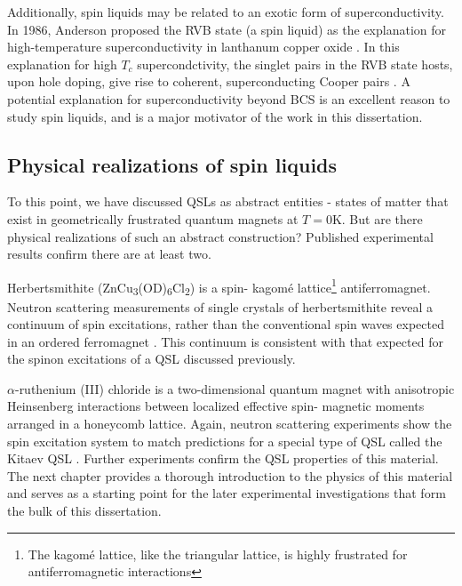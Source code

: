 Additionally, spin liquids may be related to an exotic form of superconductivity. In 1986, Anderson proposed the RVB state (a spin liquid) as the explanation for high-temperature superconductivity in lanthanum copper oxide \cite{Anderson1986}. In this explanation for high $T_{c}$ supercondctivity, the singlet pairs in the RVB state hosts, upon hole doping, give rise to coherent, superconducting Cooper pairs  \cite{Chen2018}. A potential explanation for superconductivity beyond BCS is an excellent reason to study spin liquids, and is a major motivator of the work in this dissertation.

\subsection{Physical realizations of spin liquids}

To this point, we have discussed QSLs as abstract entities - states of matter that exist in geometrically frustrated quantum magnets at $T = 0$K. But are there physical realizations of such an abstract construction? Published experimental results confirm there are at least two.

Herbertsmithite (ZnCu\textsubscript{3}(OD)\textsubscript{6}Cl\textsubscript{2}) is a spin-\textonehalf{} kagom\'{e}{} lattice\footnote{The kagom\'{e} lattice, like the triangular lattice, is highly frustrated for antiferromagnetic interactions} antiferromagnet. Neutron scattering measurements of single crystals of herbertsmithite reveal a continuum of spin excitations, rather than the conventional spin waves expected in an ordered ferromagnet \cite{Han2012}. This continuum is consistent with that expected for the spinon excitations of a QSL discussed previously.

$\alpha$-ruthenium (III) chloride is a two-dimensional quantum magnet with anisotropic Heinsenberg interactions between localized effective spin-\textonehalf{} magnetic moments arranged in a honeycomb lattice. Again, neutron scattering experiments show the spin excitation system to match predictions for a special type of QSL called the Kitaev QSL \cite{Banerjee2016}. Further experiments confirm the QSL properties of this material. The next chapter provides a thorough introduction to the physics of this material and serves as a starting point for the later experimental investigations that form the bulk of this dissertation.